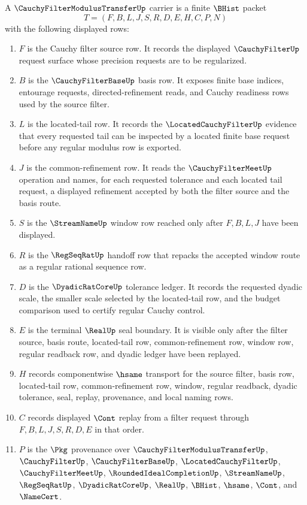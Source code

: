 \begin{definition}
\label{def:cauchy-filter-modulus-transfer-carrier}
A $\CauchyFilterModulusTransferUp$ carrier is a finite $\BHist$ packet
$$
T=(F,B,L,J,S,R,D,E,H,C,P,N)
$$
with the following displayed rows:
\begin{enumerate}
\item $F$ is the Cauchy filter source row. It records the displayed $\CauchyFilterUp$ request surface whose precision requests are to be regularized.
\item $B$ is the $\CauchyFilterBaseUp$ basis row. It exposes finite base indices, entourage requests, directed-refinement reads, and Cauchy readiness rows used by the source filter.
\item $L$ is the located-tail row. It records the $\LocatedCauchyFilterUp$ evidence that every requested tail can be inspected by a located finite base request before any regular modulus row is exported.
\item $J$ is the common-refinement row. It reads the $\CauchyFilterMeetUp$ operation and names, for each requested tolerance and each located tail request, a displayed refinement accepted by both the filter source and the basis route.
\item $S$ is the $\StreamNameUp$ window row reached only after $F,B,L,J$ have been displayed.
\item $R$ is the $\RegSeqRatUp$ handoff row that repacks the accepted window route as a regular rational sequence row.
\item $D$ is the $\DyadicRatCoreUp$ tolerance ledger. It records the requested dyadic scale, the smaller scale selected by the located-tail row, and the budget comparison used to certify regular Cauchy control.
\item $E$ is the terminal $\RealUp$ seal boundary. It is visible only after the filter source, basis route, located-tail row, common-refinement row, window row, regular readback row, and dyadic ledger have been replayed.
\item $H$ records componentwise $\hsame$ transport for the source filter, basis row, located-tail row, common-refinement row, window, regular readback, dyadic tolerance, seal, replay, provenance, and local naming rows.
\item $C$ records displayed $\Cont$ replay from a filter request through $F,B,L,J,S,R,D,E$ in that order.
\item $P$ is the $\Pkg$ provenance over $\CauchyFilterModulusTransferUp$, $\CauchyFilterUp$, $\CauchyFilterBaseUp$, $\LocatedCauchyFilterUp$, $\CauchyFilterMeetUp$, $\RoundedIdealCompletionUp$, $\StreamNameUp$, $\RegSeqRatUp$, $\DyadicRatCoreUp$, $\RealUp$, $\BHist$, $\hsame$, $\Cont$, and $\NameCert$.

\end{enumerate}
\end{definition}
